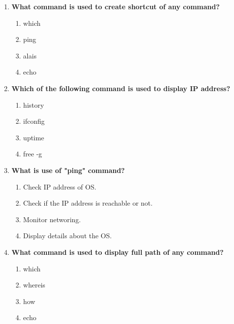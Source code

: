 \begin{flushleft}
\begin{enumerate}
		\bigskip
		\bigskip
		\item \textbf{What command is used to create shortcut of any command?}
		\begin{enumerate}[label=(\alph*)]
			\item which   
			\item ping
			\item alais       %
			\item echo
		\end{enumerate}
		\bigskip
		\bigskip
		\item \textbf{Which of the following command is used to display IP address?}
		\begin{enumerate}[label=(\alph*)]
			\item history
			\item ifconfig
			\item uptime
			\item free -g  %
		\end{enumerate}  
		\bigskip
		\bigskip
		\item \textbf{What is use of "ping" command?}
		\begin{enumerate}[label=(\alph*)]
			\item Check IP address of OS.
			\item Check if the IP address is reachable or not.  %
			\item Monitor networing.
			\item Display details about the OS.
		\end{enumerate}  
		\bigskip
		\bigskip
		\item \textbf{What command is used to display full path of any command?}
		\begin{enumerate}[label=(\alph*)]
			\item which       %
			\item whereis 
			\item how
			\item echo
		\end{enumerate}  
	\end{enumerate}
	
	
\end{flushleft}
\newpage

\afterpage{\blankpage}